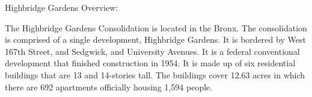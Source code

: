 Highbridge Gardens Overview:   

    

The Highbridge Gardens Consolidation is located in the Bronx. The consolidation is comprised of a single development, Highbridge Gardens. It is bordered by West 167th Street, and Sedgwick, and University Avenues. It is a federal conventional development that finished construction in 1954. It is made up of six residential buildings that are 13 and 14-stories tall. The buildings cover 12.63 acres in which there are 692 apartments officially housing 1,594 people.